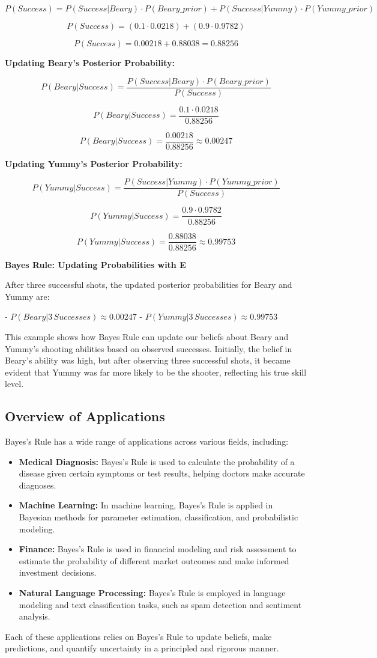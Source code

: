 \documentclass[12pt]{book} %
\begin{document}
\[ P(Success) = P(Success|Beary) \cdot P(Beary\_prior) + P(Success|Yummy) \cdot P(Yummy\_prior) \]

\[ P(Success) = (0.1 \cdot 0.0218) + (0.9 \cdot 0.9782) \]

\[ P(Success) = 0.00218 + 0.88038 = 0.88256 \]

\textbf{Updating Beary's Posterior Probability:}

\[ P(Beary|Success) = \frac{P(Success|Beary) \cdot P(Beary\_prior)}{P(Success)} \]

\[ P(Beary|Success) = \frac{0.1 \cdot 0.0218}{0.88256} \]

\[ P(Beary|Success) = \frac{0.00218}{0.88256} \approx 0.00247 \]

\textbf{Updating Yummy's Posterior Probability:}

\[ P(Yummy|Success) = \frac{P(Success|Yummy) \cdot P(Yummy\_prior)}{P(Success)} \]

\[ P(Yummy|Success) = \frac{0.9 \cdot 0.9782}{0.88256} \]

\[ P(Yummy|Success) = \frac{0.88038}{0.88256} \approx 0.99753 \]

\textbf{Bayes Rule: Updating Probabilities with E}

After three successful shots, the updated posterior probabilities for Beary and Yummy are:

- \( P(Beary|3 \, Successes) \approx 0.00247 \)
- \( P(Yummy|3 \, Successes) \approx 0.99753 \)

This example shows how Bayes Rule can update our beliefs about Beary and Yummy's shooting abilities based on observed successes. Initially, the belief in Beary's ability was high, but after observing three successful shots, it became evident that Yummy was far more likely to be the shooter, reflecting his true skill level.

\subsection{Overview of Applications}

Bayes's Rule has a wide range of applications across various fields, including:
\begin{itemize}
    \item \textbf{Medical Diagnosis:} Bayes's Rule is used to calculate the probability of a disease given certain symptoms or test results, helping doctors make accurate diagnoses.
    \item \textbf{Machine Learning:} In machine learning, Bayes's Rule is applied in Bayesian methods for parameter estimation, classification, and probabilistic modeling.
    \item \textbf{Finance:} Bayes's Rule is used in financial modeling and risk assessment to estimate the probability of different market outcomes and make informed investment decisions.
    \item \textbf{Natural Language Processing:} Bayes's Rule is employed in language modeling and text classification tasks, such as spam detection and sentiment analysis.
\end{itemize}
Each of these applications relies on Bayes's Rule to update beliefs, make predictions, and quantify uncertainty in a principled and rigorous manner.
\end{document}
